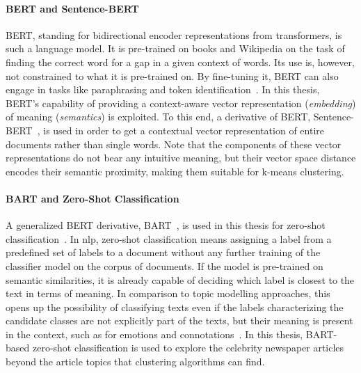 \paragraph{BERT and Sentence-BERT}\label{ch:sentencebert}
BERT, standing for bidirectional encoder representations from transformers, is such a language model. It is pre-trained on books and Wikipedia on the task of finding the correct word for a gap in a given context of words. Its use is, however, not constrained to what it is pre-trained on. By fine-tuning it, BERT can also engage in tasks like paraphrasing and token identification~\autocite{devlin_bert_2019}. In this thesis, BERT's capability of providing a context-aware vector representation (\textit{embedding}) of meaning (\textit{semantics}) is exploited. To this end, a derivative of BERT, Sentence-BERT~\autocite{reimers_sentence-bert_2019}, is used in order to get a contextual vector representation of entire documents rather than single words. Note that the components of these vector representations do not bear any intuitive meaning, but their vector space distance encodes their semantic proximity, making them suitable for k-means clustering.

\paragraph{BART and Zero-Shot Classification}\label{ch:zero_shot}
A generalized BERT derivative, BART~\autocite{lewis_bart_2020}, is used in this thesis for zero-shot classification~\autocite{huggingfacebart-large-mnli_facebookbart-large-mnli_nodate,davison_zero-shot_2020}. In \gls{nlp}, zero-shot classification means assigning a label from a predefined set of labels to a document without any further training of the classifier model on the corpus of documents. If the model is pre-trained on semantic similarities, it is already capable of deciding which label is closest to the text in terms of meaning. In comparison to topic modelling approaches, this opens up the possibility of classifying texts even if the labels characterizing the candidate classes are not explicitly part of the texts, but their meaning is present in the context, such as for emotions and connotations~\autocite{yin_benchmarking_2019}. In this thesis, BART-based zero-shot classification is used to explore the celebrity newspaper articles beyond the article topics that clustering algorithms can find.

